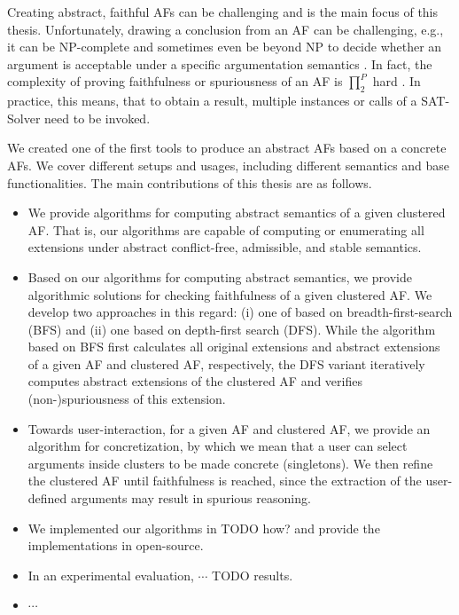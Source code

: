 Creating abstract, faithful AFs can be challenging and is the main focus of this thesis. Unfortunately, drawing a conclusion from an AF can be challenging, e.g., it can be NP-complete and sometimes even be beyond NP to decide whether an argument is acceptable under a specific argumentation semantics \cite{DBLP:journals/ai/DvorakGRW23}. In fact, the complexity of proving faithfulness or spuriousness of an AF is $\prod_2^P$ hard \cite{DBLP:conf/kr/SaribaturW21}. In practice, this means, that to obtain a result, multiple instances or calls of a SAT-Solver need to be invoked.

We created one of the first tools to produce an abstract AFs based on a concrete AFs. We cover different setups and usages, including different semantics and base functionalities. The main contributions of this thesis are as follows.

\begin{itemize}
    \item We provide algorithms for computing abstract semantics of a given clustered AF. That is, our algorithms are capable of computing or enumerating all extensions under abstract conflict-free, admissible, and stable semantics.

    \item Based on our algorithms for computing abstract semantics, we provide algorithmic solutions for checking faithfulness of a given clustered AF. We develop two approaches in this regard: (i) one of based on breadth-first-search (BFS) and (ii) one based on depth-first search (DFS). While the algorithm based on BFS first calculates all original extensions and abstract extensions of a given AF and clustered AF, respectively, the DFS variant iteratively computes abstract extensions of the clustered AF and verifies (non-)spuriousness of this extension.

    \item Towards user-interaction, for a given AF and clustered AF, we provide an algorithm for concretization, by which we mean that a user can select arguments inside clusters to be made concrete (singletons). We then refine the clustered AF until faithfulness is reached, since the extraction of the user-defined arguments may result in spurious reasoning.
    
    \item We implemented our algorithms in TODO how? and provide the implementations in open-source.
    \item In an experimental evaluation, $\cdots$ TODO results.
    \item $\cdots$
\end{itemize}

